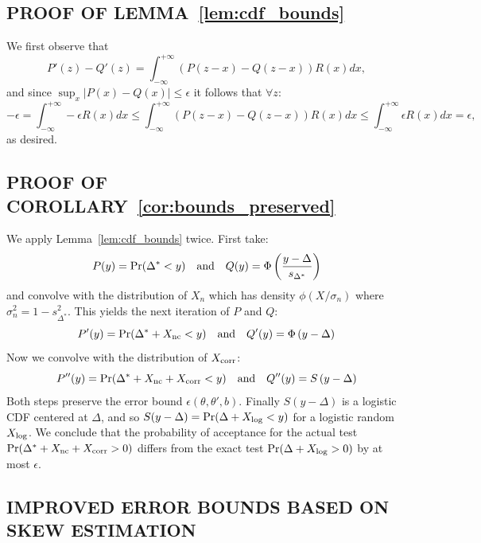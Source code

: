 \documentclass[letterpaper]{article}
\begin{document}
\subsection{PROOF OF LEMMA~\ref{lem:cdf_bounds}}\label{app:proof_cdf_bounds}

We first observe that
\[
    P'(z) - Q'(z) = \int_{-\infty}^{+\infty}(P(z-x)-Q(z-x))R(x) dx,
\]
and since $\sup_x|P(x)-Q(x)|\leq \epsilon$ it follows that $\forall z$:
\begin{equation}
-\epsilon = \int_{-\infty}^{+\infty} -\epsilon R(x) dx \leq \int_{-\infty}^{+\infty}(P(z-x)-Q(z-x))R(x) dx \leq \int_{-\infty}^{+\infty}\epsilon R(x) dx = \epsilon,
\end{equation}
as desired.


\subsection{PROOF OF COROLLARY~\ref{cor:bounds_preserved}}\label{app:bounds_preserved}

We apply Lemma~\ref{lem:cdf_bounds} twice. First take:
\begin{equation}
    P(y) = {\rm Pr}(\Delta^* < y)
     \quad {\rm and} \quad Q(y) = \Phi\left(\frac{y-\Delta}{s_{\Delta^*}}\right)
\end{equation}
and convolve with the distribution of $X_n$ which has density $\phi(X/\sigma_n)$
where $\sigma_n^2 = 1 - s^2_{\Delta^*}$. This yields the next iteration of $P$
and $Q$:
\begin{equation}
    P'(y) = {\rm Pr}(\Delta^*+X_{\rm nc} < y)
    \quad {\rm and}\quad Q'(y) = \Phi\left({y-\Delta}\right)
\end{equation}
Now we convolve with the distribution of $X_{\rm corr}$:
\begin{equation}
    P''(y) = {\rm Pr}(\Delta^*+X_{\rm nc}+X_{\rm corr} < y)
    \quad {\rm and}\quad Q''(y) = S\left({y-\Delta}\right)
\end{equation}
Both steps preserve the error bound $\epsilon(\theta,\theta',b)$. Finally
$S(y-\Delta)$ is a logistic CDF centered at $\Delta$, and so $S(y-\Delta) = {\rm
Pr}(\Delta + X_{\rm log} < y)$ for a logistic random $X_{\rm log}$. We conclude
that the probability of acceptance for the actual test ${\rm Pr}(\Delta^*+X_{\rm
nc}+X_{\rm corr} > 0)$ differs from the exact test ${\rm Pr}(\Delta+X_{\rm log}
> 0)$ by at most $\epsilon$.


\subsection{IMPROVED ERROR BOUNDS BASED ON SKEW ESTIMATION}\label{app:better_error_bound}
\end{document}
